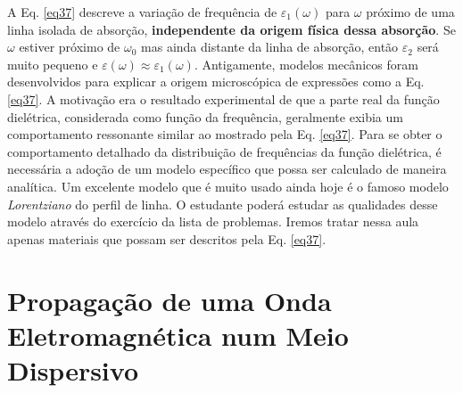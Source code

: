 \documentclass{article}
\begin{document}
A Eq. \eqref{eq37} descreve a variação de frequência de $\varepsilon_1(\omega)$ para $\omega$ próximo de uma linha isolada de absorção, \textbf{independente da origem física dessa absorção}. Se $\omega$ estiver próximo de $\omega_0$ mas ainda distante da linha de absorção, então $\varepsilon_2$ será muito pequeno e $\varepsilon(\omega)\approx\varepsilon_1(\omega)$. Antigamente, modelos mecânicos foram desenvolvidos para explicar a origem microscópica de expressões como a Eq. \eqref{eq37}. A motivação era o resultado experimental de que a parte real da função dielétrica, considerada como função da frequência, geralmente exibia um comportamento ressonante similar ao mostrado pela Eq. \eqref{eq37}. Para se obter o comportamento detalhado da distribuição de frequências da função dielétrica, é necessária a adoção de um modelo específico que possa ser calculado de maneira analítica. Um excelente modelo que é muito usado ainda hoje é o famoso modelo \textit{Lorentziano} do perfil de linha. O estudante poderá estudar as qualidades desse modelo através do exercício da lista de problemas. Iremos tratar nessa aula apenas materiais que possam ser descritos pela Eq. \eqref{eq37}.

\section{Propagação de uma Onda Eletromagnética num Meio Dispersivo}
\end{document}
